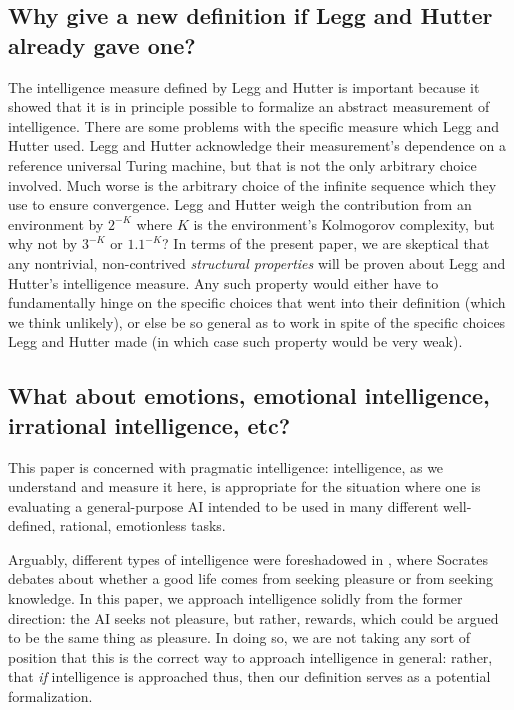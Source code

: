 \documentclass[twoside,11pt]{article}
\begin{document}
\subsection{Why give a new definition if Legg and Hutter already gave one?}

The intelligence measure defined by Legg and Hutter is important because it showed
that it is in principle possible to formalize an abstract measurement of intelligence.
There are some problems with the specific measure which Legg and Hutter used.
Legg and Hutter acknowledge their measurement's dependence on a
reference universal Turing machine, but that is not the only arbitrary choice involved.
Much worse is the arbitrary choice of the infinite sequence which they use to ensure
convergence. Legg and Hutter weigh the contribution from an environment by $2^{-K}$ where
$K$ is the environment's Kolmogorov complexity, but why not by $3^{-K}$ or $1.1^{-K}$?
In terms of the present paper, we are skeptical that any nontrivial, non-contrived
\emph{structural properties} will be proven about Legg and Hutter's intelligence measure.
Any such property would either have to fundamentally hinge on the specific
choices that went into their definition (which we think unlikely),
or else be so general as to work in spite of the specific choices Legg and Hutter made
(in which case such property would be very weak).

\subsection{What about emotions, emotional intelligence, irrational intelligence, etc?}

This paper is concerned with pragmatic intelligence: intelligence,
as we understand and measure it here, is appropriate for the situation where one
is evaluating a general-purpose AI intended to be used in many different
well-defined, rational, emotionless tasks. 

Arguably, different types of intelligence were foreshadowed in
\citet{philebus}, where Socrates debates about whether a good life comes
from seeking pleasure or from seeking knowledge. In this paper, we approach
intelligence solidly from the former direction: the AI seeks not pleasure, but
rather, rewards, which could be argued to be the same thing as pleasure.
In doing so, we are not taking any sort of position that this is the correct
way to approach intelligence in general: rather, that \emph{if} intelligence is
approached thus, then our definition serves as a potential formalization.
\end{document}
